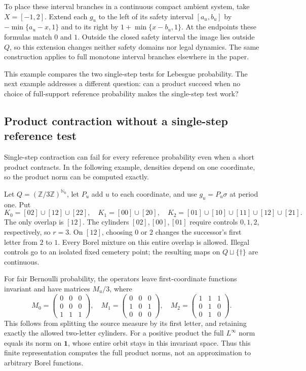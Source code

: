 \documentclass[11pt,reqno]{amsart}
\numberwithin{equation}{section}
\theoremstyle{definition}
\theoremstyle{definition}
\newcommand{\Nzero}{\mathbb N_0}
\newcommand{\one}{\mathbf 1}
\begin{document}
To place these interval branches in a continuous compact ambient
system, take $X=[-1,2]$. Extend each $g_u$ to the left of its
safety interval $[a_u,b_u]$ by $-\min\{a_u-x,1\}$ and to its
right by $1+\min\{x-b_u,1\}$. At the endpoints these formulas
match $0$ and $1$. Outside the closed safety interval the image
lies outside $Q$, so this extension changes neither safety domains
nor legal dynamics. The same construction applies to full monotone
interval branches elsewhere in the paper.

This example compares the two single-step tests for Lebesgue
probability. The next example addresses a different question: can a
product succeed when no choice of full-support reference probability
makes the single-step test work?

\subsection{Product contraction without a single-step reference test}
\label{subsec:product-example}
Single-step contraction can fail for every reference probability even
when a short product contracts. In the following example, densities
depend on one coordinate, so the product norm can be computed exactly.

Let $Q=(\mathbb Z/3\mathbb Z)^{\Nzero}$, let $P_u$ add $u$
to each coordinate, and use $g_u=P_u\sigma$ at period one. Put
\[
 K_0=[02]\cup[12]\cup[22],\quad K_1=[00]\cup[20],\quad
 K_2=[01]\cup[10]\cup[11]\cup[12]\cup[21].
\]
The only overlap is $[12]$. The cylinders $[02],[00],[01]$
require controls $0,1,2$, respectively, so $r=3$.
On $[12]$, choosing $0$ or $2$ changes the successor's first
letter from $2$ to $1$. Every Borel mixture on this entire overlap
is allowed. Illegal controls go to an isolated fixed cemetery point;
the resulting maps on $Q\sqcup\{\dagger\}$ are continuous.

For fair Bernoulli probability, the operators leave first-coordinate
functions invariant and have matrices $M_u/3$, where
\[
 M_0=\begin{pmatrix}0&0&0\\0&0&0\\1&1&1\end{pmatrix},\quad
 M_1=\begin{pmatrix}0&0&0\\1&0&1\\0&0&0\end{pmatrix},\quad
 M_2=\begin{pmatrix}1&1&1\\0&1&0\\0&1&0\end{pmatrix}.
\]
This follows from splitting the source measure by its first letter,
and retaining exactly the allowed two-letter cylinders. For a
positive product the full $L^\infty$ norm equals its norm on
$\one$, whose entire orbit stays in this invariant space. Thus this
finite representation computes the full product norms, not an
approximation to arbitrary Borel functions.
\end{document}
